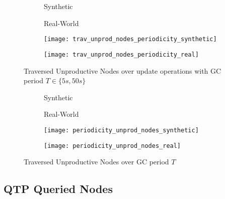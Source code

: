 \documentclass[abstracton,12pt]{scrartcl}
\theoremstyle{definition}
\begin{document}
\begin{figure}[h]
  \centering
  \begin{subfigure}{0.49\linewidth}
    \centering
    Synthetic
  \end{subfigure}
  \begin{subfigure}{0.49\linewidth}
    \centering
    Real-World
  \end{subfigure}
  \begin{subfigure}{0.49\linewidth}
    \centering
    \texttt{[image: trav\_unprod\_nodes\_periodicity\_synthetic]}
    \caption{}
    \label{fig:trav_unprod_nodes_periodicity_synthetic}
  \end{subfigure}
  \begin{subfigure}{0.49\linewidth}
    \centering
    \texttt{[image: trav\_unprod\_nodes\_periodicity\_real]}
    \caption{}
    \label{fig:trav_unprod_nodes_periodicity_real}
  \end{subfigure}
  \caption{Traversed Unproductive Nodes over update operations with GC period $T \in \{5s, 50s\}$}
\end{figure}

\begin{figure}[h]
  \centering
  \begin{subfigure}{0.49\linewidth}
    \centering
    Synthetic
  \end{subfigure}
  \begin{subfigure}{0.49\linewidth}
    \centering
    Real-World
  \end{subfigure}
  \begin{subfigure}{0.49\linewidth}
    \centering
    \texttt{[image: periodicity\_unprod\_nodes\_synthetic]}
    \caption{}
    \label{fig:periodicity_unprod_nodes_synthetic}
  \end{subfigure}
  \begin{subfigure}{0.49\linewidth}
    \centering
    \texttt{[image: periodicity\_unprod\_nodes\_real]}
    \caption{}
    \label{fig:periodicity_unprod_nodes_real}
  \end{subfigure}
  \caption{Traversed Unproductive Nodes over GC period $T$}
\end{figure}

\lipsum[2-4]

\subsection{QTP Queried Nodes}

\label{sec:qtp-queried-nodes}
\end{document}
